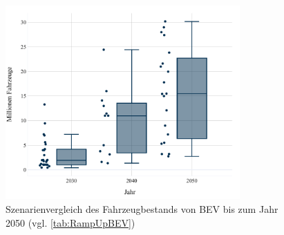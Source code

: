 \begin{figure}[H]
    \centering
    \includegraphics[width=0.8\textwidth]{Bilder/RampUp-BEV-MA}
    \caption[Szenarienvergleich des Fahrzeugbestandes von BEV bis zum Jahr \num{2050}]{Szenarienvergleich des Fahrzeugbestands von BEV bis zum Jahr \num{2050} (vgl. \autoref{tab:RampUpBEV})}\label{fig:RampUpBEV}
\end{figure}
